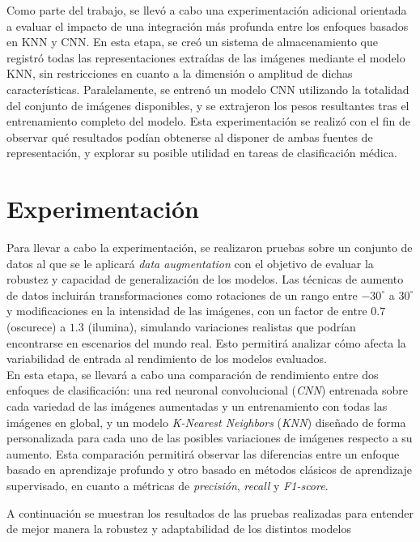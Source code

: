 \documentclass[12pt]{article} %
\begin{document}
Como parte del trabajo, se llevó a cabo una experimentación adicional orientada a evaluar el impacto de una integración más profunda entre los enfoques basados en KNN y CNN. En esta etapa, se creó un sistema de almacenamiento que registró todas las representaciones extraídas de las imágenes mediante el modelo KNN, sin restricciones en cuanto a la dimensión o amplitud de dichas características. Paralelamente, se entrenó un modelo CNN utilizando la totalidad del conjunto de imágenes disponibles, y se extrajeron los pesos resultantes tras el entrenamiento completo del modelo. Esta experimentación se realizó con el fin de observar qué resultados podían obtenerse al disponer de ambas fuentes de representación, y explorar su posible utilidad en tareas de clasificación médica. 

 

\section{Experimentación}
Para llevar a cabo la experimentación, se realizaron pruebas sobre un conjunto de datos al que se le aplicará \textit{data augmentation} con el objetivo de evaluar la robustez y capacidad de generalización de los modelos. Las técnicas de aumento de datos incluirán transformaciones como rotaciones de un rango entre $-30^\circ$ a $30^\circ$ y modificaciones en la intensidad de las imágenes, con un factor de entre $0.7$ (oscurece) a $1.3$ (ilumina), simulando variaciones realistas que podrían encontrarse en escenarios del mundo real. Esto permitirá analizar cómo afecta la variabilidad de entrada al rendimiento de los modelos evaluados. \\

En esta etapa, se llevará a cabo una comparación de rendimiento entre dos enfoques de clasificación: una red neuronal convolucional (\textit{CNN}) entrenada sobre cada variedad de las imágenes aumentadas y un entrenamiento con todas las imágenes en global, y un modelo \textit{K-Nearest Neighbors} (\textit{KNN}) diseñado de forma personalizada para cada uno de las posibles variaciones de imágenes respecto a su aumento. Esta comparación permitirá observar las diferencias entre un enfoque basado en aprendizaje profundo y otro basado en métodos clásicos de aprendizaje supervisado, en cuanto a métricas de \textit{precisión}, \textit{recall} y \textit{F1-score}.

A continuación se muestran los resultados de las pruebas realizadas para entender de mejor manera la robustez y adaptabilidad de los distintos modelos
\end{document}
